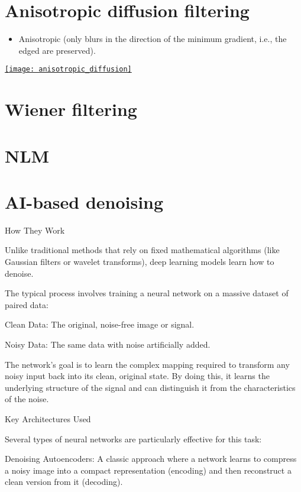 \section{Anisotropic diffusion filtering}
\begin{itemize}
\item Anisotropic (only blurs in the direction of the minimum
  gradient, i.e., the edged are preserved).
\end{itemize}
\begin{center}
    \href{https://dsp.stackexchange.com/questions/14606/anisotropic-diffusion}{\texttt{[image: anisotropic\_diffusion]}}
\end{center}

\section{Wiener filtering}


\section{\gls{NLM}}

\section{\gls{AI}-based denoising}
How They Work

Unlike traditional methods that rely on fixed mathematical algorithms (like Gaussian filters or wavelet transforms), deep learning models learn how to denoise.

The typical process involves training a neural network on a massive dataset of paired data:

    Clean Data: The original, noise-free image or signal.

    Noisy Data: The same data with noise artificially added.

    The network's goal is to learn the complex mapping required to transform any noisy input back into its clean, original state. By doing this, it learns the underlying structure of the signal and can distinguish it from the characteristics of the noise.

Key Architectures Used

Several types of neural networks are particularly effective for this task:

    Denoising Autoencoders: A classic approach where a network learns to compress a noisy image into a compact representation (encoding) and then reconstruct a clean version from it (decoding).

